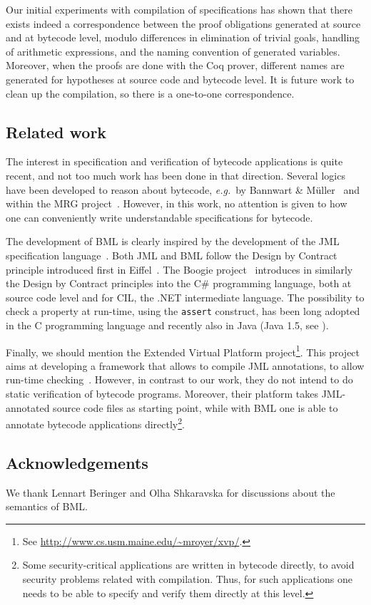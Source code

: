 Our initial experiments with compilation of specifications has shown
that there exists indeed a correspondence between the proof
obligations generated at source and at bytecode level, modulo
differences in elimination of trivial goals, handling of arithmetic
expressions, and the naming convention of generated
variables. Moreover, when the proofs are done with the Coq prover,
different names are generated for hypotheses at source code and
bytecode level. It is future work to clean up the compilation, so
there is a one-to-one correspondence.




 

\subsection*{Related work}
The interest in specification and verification of bytecode
applications is quite recent, and not too much work has been done in
that direction. Several logics have been developed to reason about
bytecode, \emph{e.g.}~by Bannwart \& M\"uller~\cite{BannwartMueller05}
and within the MRG project~\cite{AspinallEtAl:TPHOLs2004}. However,
in this work, no attention is given to how one can conveniently write
understandable specifications for bytecode.

The development of BML is clearly inspired by the development of the
JML specification language~\cite{JMLReferenceManual05}. Both JML and
BML follow the Design by Contract principle introduced first in
Eiffel~\cite{Meyer97}. The Boogie project~\cite{BarnettCDJL05}
introduces in similarly the Design by Contract principles into the C\#
programming language, both at source code level and for CIL, the .NET
intermediate language.  The possibility to check a property at
run-time, using the \texttt{assert} construct, has been long 
adopted in the C programming language and recently also in Java (Java
1.5, see \cite[\S 14.10]{JLS}). 

Finally, we should mention the Extended Virtual Platform
project\footnote{See
\url{http://www.cs.usm.maine.edu/~mroyer/xvp/}.}. This project aims at
developing a framework that allows to compile JML annotations, to
allow run-time checking~\cite{AlagicXVP05}. However, in contrast to
our work, they do not intend to do static verification of bytecode
programs. Moreover, their platform takes JML-annotated source code
files as starting point, while with BML one is able to annotate
bytecode applications directly\footnote{Some security-critical
applications are written in bytecode directly, to avoid security
problems related with compilation. Thus, for such applications one
needs to be able to specify and verify them directly at this level.}.



\subsection*{Acknowledgements}
We thank Lennart Beringer and Olha Shkaravska for discussions about
the semantics of BML. 
